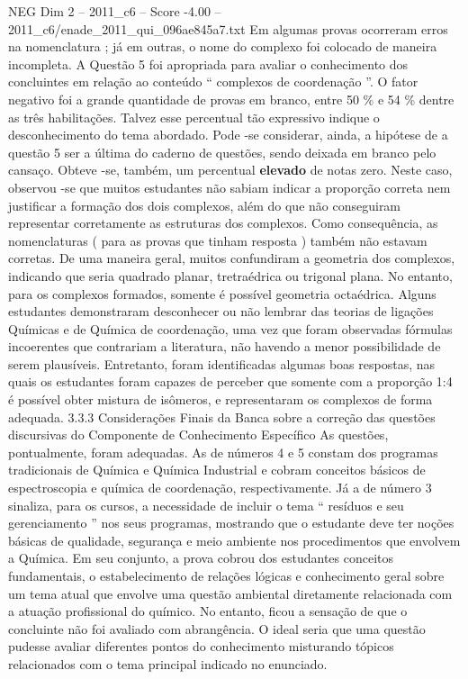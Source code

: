 \begin{textsample}{NEG Dim 2 – 2011\_c6 – Score -4.00 – 2011\_c6/enade\_2011\_qui\_096ae845a7.txt}
Em algumas provas ocorreram erros na nomenclatura ; já em outras, o nome do complexo foi colocado de maneira incompleta.
A Questão 5 foi apropriada para avaliar o conhecimento dos concluintes em relação ao conteúdo “ complexos de coordenação ”.
O fator negativo foi a grande quantidade de provas em branco, entre 50 \% e 54 \% dentre as três habilitações.
Talvez esse percentual tão expressivo indique o desconhecimento do tema abordado.
Pode -se considerar, ainda, a hipótese de a questão 5 ser a última do caderno de questões, sendo deixada em branco pelo cansaço.
Obteve -se, também, um percentual \textbf{elevado} de notas zero.
Neste caso, observou -se que muitos estudantes não sabiam indicar a proporção correta nem justificar a formação dos dois complexos, além do que não conseguiram representar corretamente as estruturas dos complexos.
Como consequência, as nomenclaturas ( para as provas que tinham resposta ) também não estavam corretas.
De uma maneira geral, muitos confundiram a geometria dos complexos, indicando que seria quadrado planar, tretraédrica ou trigonal plana.
No entanto, para os complexos formados, somente é possível geometria octaédrica.
Alguns estudantes demonstraram desconhecer ou não lembrar das teorias de ligações Químicas e de Química de coordenação, uma vez que foram observadas fórmulas incoerentes que contrariam a literatura, não havendo a menor possibilidade de serem plausíveis.
Entretanto, foram identificadas algumas boas respostas, nas quais os estudantes foram capazes de perceber que somente com a proporção 1:4 é possível obter mistura de isômeros, e representaram os complexos de forma adequada. 3.3.3 Considerações Finais da Banca sobre a correção das questões discursivas do Componente de Conhecimento Específico As questões, pontualmente, foram adequadas.
As de números 4 e 5 constam dos programas tradicionais de Química e Química Industrial e cobram conceitos básicos de espectroscopia e química de coordenação, respectivamente.
Já a de número 3 sinaliza, para os cursos, a necessidade de incluir o tema “ resíduos e seu gerenciamento ” nos seus programas, mostrando que o estudante deve ter noções básicas de qualidade, segurança e meio ambiente nos procedimentos que envolvem a Química.
Em seu conjunto, a prova cobrou dos estudantes conceitos fundamentais, o estabelecimento de relações lógicas e conhecimento geral sobre um tema atual que envolve uma questão ambiental diretamente relacionada com a atuação profissional do químico.
No entanto, ficou a sensação de que o concluinte não foi avaliado com abrangência.
O ideal seria que uma questão pudesse avaliar diferentes pontos do conhecimento misturando tópicos relacionados com o tema principal indicado no enunciado.

\end{textsample}

